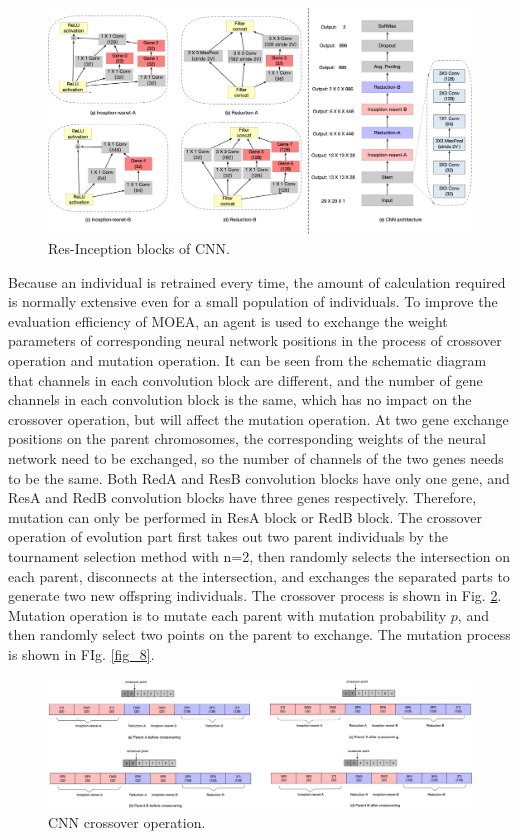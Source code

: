 \documentclass[lettersize,journal]{IEEEtran}
\begin{document}
\begin{figure}[!t]
\centering
\includegraphics[width=7in]{cnn-overall}
\caption{Res-Inception blocks of CNN.}
\label{fig_6}
\end{figure}

Because an individual is retrained every time, the amount of calculation required is normally extensive even for a small population of individuals. To improve the evaluation efficiency of MOEA, an agent is used to exchange the weight parameters of corresponding neural network positions in the process of crossover operation and mutation operation. It can be seen from the schematic diagram that channels in each convolution block are different, and the number of gene channels in each convolution block is the same, which has no impact on the crossover operation, but will affect the mutation operation. At two gene exchange positions on the parent chromosomes, the corresponding weights of the neural network need to be exchanged, so the number of channels of the two genes needs to be the same. Both RedA and ResB convolution blocks have only one gene, and ResA and RedB convolution blocks have three genes respectively. Therefore, mutation can only be performed in ResA block or RedB block. The crossover operation of evolution part first takes out two parent individuals by the tournament selection method with n=2, then randomly selects the intersection on each parent, disconnects at the intersection, and exchanges the separated parts to generate two new offspring individuals. The crossover process is shown in Fig. \ref{fig_7}. Mutation operation is to mutate each parent with mutation probability $p$, and then randomly select two points on the parent to exchange. The mutation process is shown in FIg. \ref{fig_8}.

\begin{figure}[!t]
\centering
\includegraphics[width=7in]{cnn-cross}
\caption{CNN crossover operation.}
\label{fig_7}
\end{figure}
\end{document}
